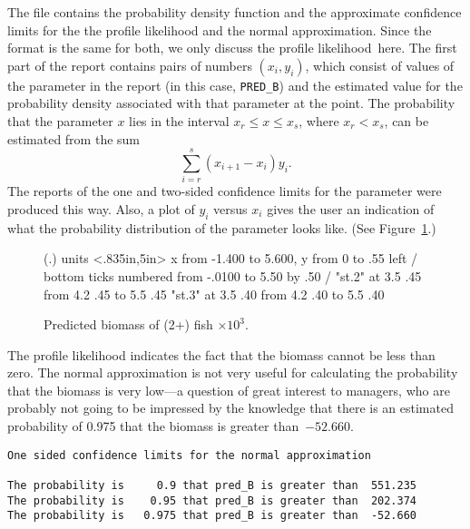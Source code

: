 \documentclass{admbmanual}
\newcommand\apl{profile likelihood}
\begin{document}
The file contains the probability density function and the approximate
confidence limits for the the profile likelihood and the normal approximation.
Since the format is the same for both, we only discuss the \apl\ here. The first
part of the report contains pairs of numbers $(x_i,y_i)$, which consist of
values of the parameter in the report (in this case, \texttt{PRED\_B}) and the
estimated value for the probability density associated with that parameter at
the point. The probability that the parameter $x$ lies in the interval
$x_r \le x\le x_s$,
where $x_r<x_s$, can be estimated from the sum
$$\sum_{i=r}^s (x_{i+1}-x_i)y_i.$$
The reports of the one and two-sided confidence limits for the parameter were
produced this way. Also, a plot of $y_i$ versus $x_i$ gives the user an
indication of what the probability distribution of the parameter looks like.
(See Figure~\ref{fig:05}.)
\begin{figure}[htbp]
\centering\hskip1pt\beginpicture
    \setplotsymbol ({\eightrm .})
  \setcoordinatesystem units <.835in,5in>
  \setplotarea x from -1.400 to 5.600, y from 0 to .55
  \axis left
  /
  \axis bottom
   ticks
    numbered from -.0100 to 5.50 by .50
  /
\setdashpattern <2pt,2pt,2pt,3pt>
 \plot  "st.2"
 \twelverm
  at 3.5 .45
 \putrule from 4.2 .45 to 5.5 .45
\setdashpattern <1pt,3pt,4pt,3pt>
 \plot  "st.3"
  at 3.5 .40
 \putrule from 4.2 .40 to 5.5 .40
\endpicture
\caption{Predicted biomass of (2+) fish $\times 10^3$.}
\label{fig:05}
\end{figure}

The profile likelihood indicates the fact that the biomass cannot be less than
zero. The normal approximation is not very useful for calculating the
probability that the biomass is very low---a question of great interest to
managers, who are probably not going to be impressed by the knowledge that there
is an estimated probability of 0.975 that the biomass is greater than~$-52.660$.
\begin{lstlisting}
One sided confidence limits for the normal approximation

The probability is     0.9 that pred_B is greater than  551.235
The probability is    0.95 that pred_B is greater than  202.374
The probability is   0.975 that pred_B is greater than  -52.660
\end{lstlisting}
\end{document}
